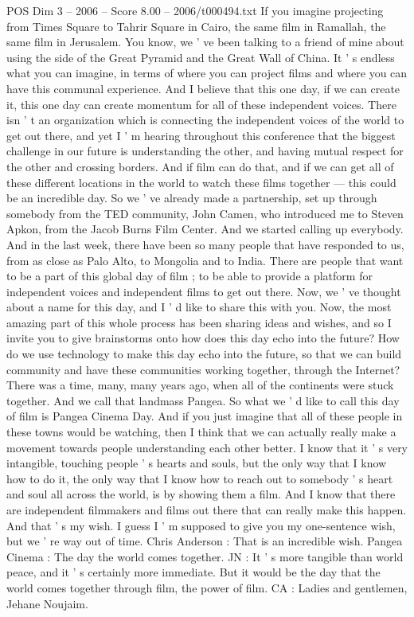 \begin{textsample}{POS Dim 3 – 2006 – Score 8.00 – 2006/t000494.txt}
If you imagine projecting from Times Square to Tahrir Square in Cairo, the same film in Ramallah, the same film in Jerusalem.
You know, we ' ve been talking to a friend of mine about using the side of the Great Pyramid and the Great Wall of China.
It ' s endless what you can imagine, in terms of where you can project films and where you can have this communal experience.
And I believe that this one day, if we can create it, this one day can create momentum for all of these independent voices.
There isn ' t an organization which is connecting the independent voices of the world to get out there, and yet I ' m hearing throughout this conference that the biggest challenge in our future is understanding the other, and having mutual respect for the other and crossing borders.
And if film can do that, and if we can get all of these different locations in the world to watch these films together — this could be an incredible day.
So we ' ve already made a partnership, set up through somebody from the TED community, John Camen, who introduced me to Steven Apkon, from the Jacob Burns Film Center.
And we started calling up everybody.
And in the last week, there have been so many people that have responded to us, from as close as Palo Alto, to Mongolia and to India.
There are people that want to be a part of this global day of film ; to be able to provide a platform for independent voices and independent films to get out there.
Now, we ' ve thought about a name for this day, and I ' d like to share this with you.
Now, the most amazing part of this whole process has been sharing ideas and wishes, and so I invite you to give brainstorms onto how does this day echo into the future?
How do we use technology to make this day echo into the future, so that we can build community and have these communities working together, through the Internet?
There was a time, many, many years ago, when all of the continents were stuck together.
And we call that landmass Pangea.
So what we ' d like to call this day of film is Pangea Cinema Day.
And if you just imagine that all of these people in these towns would be watching, then I think that we can actually really make a movement towards people understanding each other better.
I know that it ' s very intangible, touching people ' s hearts and souls, but the only way that I know how to do it, the only way that I know how to reach out to somebody ' s heart and soul all across the world, is by showing them a film.
And I know that there are independent filmmakers and films out there that can really make this happen.
And that ' s my wish.
I guess I ' m supposed to give you my one-sentence wish, but we ' re way out of time.
Chris Anderson : That is an incredible wish.
Pangea Cinema : The day the world comes together.
JN : It ' s more tangible than world peace, and it ' s certainly more immediate.
But it would be the day that the world comes together through film, the power of film.
CA : Ladies and gentlemen, Jehane Noujaim.

\end{textsample}

